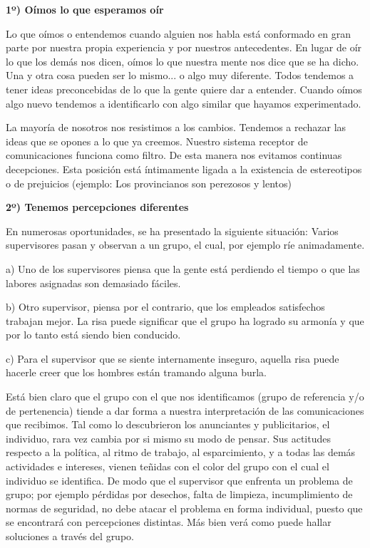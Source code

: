 \textbf{1º) Oímos lo que esperamos oír}

Lo que oímos o entendemos cuando alguien nos habla está conformado en gran parte por nuestra propia experiencia y por nuestros antecedentes. En lugar de oír lo que los demás nos dicen, oímos lo que nuestra mente nos dice que se ha dicho. Una y otra cosa pueden ser lo mismo... o algo muy diferente. Todos tendemos a tener ideas preconcebidas de lo que la gente quiere dar a entender. Cuando oímos algo nuevo tendemos a identificarlo con algo similar que hayamos experimentado.



La mayoría de nosotros nos resistimos a los cambios. Tendemos a rechazar las ideas que se opones a lo que ya creemos. Nuestro sistema receptor de comunicaciones funciona como filtro. De esta manera nos evitamos continuas decepciones. Esta posición está íntimamente ligada a la existencia de estereotipos o de prejuicios (ejemplo: Los provincianos son perezosos y lentos)

\textbf{2º) Tenemos percepciones diferentes}

En numerosas oportunidades, se ha presentado la siguiente situación: Varios supervisores pasan y observan a un grupo, el cual, por ejemplo ríe animadamente.

a) Uno de los supervisores piensa que la gente está perdiendo el tiempo o que las labores asignadas son demasiado fáciles.

b) Otro supervisor, piensa por el contrario, que los empleados satisfechos trabajan mejor. La risa puede significar que el grupo ha logrado su armonía y que por lo tanto está siendo bien conducido.

c) Para el supervisor que se siente internamente inseguro, aquella risa puede hacerle creer que los hombres están tramando alguna burla.

Está bien claro que el grupo con el que nos identificamos (grupo de referencia y/o de pertenencia) tiende a dar forma a nuestra interpretación de las comunicaciones que recibimos. Tal como lo descubrieron los anunciantes y publicitarios, el individuo, rara vez cambia por si mismo su modo de pensar. Sus actitudes respecto a la política, al ritmo de trabajo, al esparcimiento, y a todas las demás actividades e intereses, vienen teñidas con el color del grupo con el cual el individuo se identifica. De modo que el supervisor que enfrenta un problema de grupo; por ejemplo pérdidas por desechos, falta de limpieza, incumplimiento de normas de seguridad, no debe atacar el problema en forma individual, puesto que se encontrará con percepciones distintas. Más bien verá como puede hallar soluciones a través del grupo.

